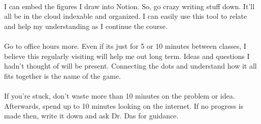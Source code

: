 \documentclass[10pt]{article}
\begin{document}
\\
I can embed the figures I draw into Notion. So, go crazy writing stuff down. It'll all be in the cloud indexable and organized. I can easily use this tool to relate and help my understanding as I continue the course.\\
\\
Go to office hours more. Even if its just for 5 or 10 minutes between classes, I believe this regularly visiting will help me out long term. Ideas and questions I hadn't thought of will be present. Connecting the dots and understand how it all fits together is the name of the game.\\
\\
If you're stuck, don't waste more than 10 minutes on the problem or idea. Afterwards, spend up to 10 minutes looking on the internet. If no progress is made then, write it down and ask Dr. Das for guidance.
\end{document}
